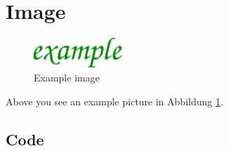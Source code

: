 \section{Image}

\begin{figure}[h!]
    \centering
    \includegraphics[width=0.3\textwidth]{fig/example.pdf}
    \caption{Example image}
    \label{fig:example}
\end{figure}
Above you see an example picture in Abbildung \ref{fig:example}. 

\subsection{Code}

